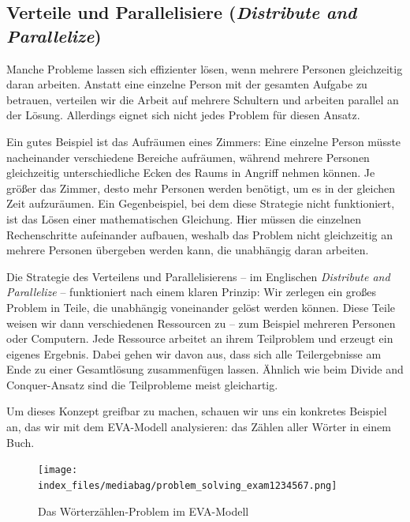 \documentclass[
  letterpaper,
  DIV=11]{scrreprt}
\begin{document}
\subsection{\texorpdfstring{Verteile und Parallelisiere
(\emph{Distribute and
Parallelize})}{Verteile und Parallelisiere (Distribute and Parallelize)}}\label{verteile-und-parallelisiere-distribute-and-parallelize}

Manche Probleme lassen sich effizienter lösen, wenn mehrere Personen
gleichzeitig daran arbeiten. Anstatt eine einzelne Person mit der
gesamten Aufgabe zu betrauen, verteilen wir die Arbeit auf mehrere
Schultern und arbeiten parallel an der Lösung. Allerdings eignet sich
nicht jedes Problem für diesen Ansatz.

Ein gutes Beispiel ist das Aufräumen eines Zimmers: Eine einzelne Person
müsste nacheinander verschiedene Bereiche aufräumen, während mehrere
Personen gleichzeitig unterschiedliche Ecken des Raums in Angriff nehmen
können. Je größer das Zimmer, desto mehr Personen werden benötigt, um es
in der gleichen Zeit aufzuräumen. Ein Gegenbeispiel, bei dem diese
Strategie nicht funktioniert, ist das Lösen einer mathematischen
Gleichung. Hier müssen die einzelnen Rechenschritte aufeinander
aufbauen, weshalb das Problem nicht gleichzeitig an mehrere Personen
übergeben werden kann, die unabhängig daran arbeiten.

Die Strategie des Verteilens und Parallelisierens -- im Englischen
\emph{Distribute and Parallelize} -- funktioniert nach einem klaren
Prinzip: Wir zerlegen ein großes Problem in Teile, die unabhängig
voneinander gelöst werden können. Diese Teile weisen wir dann
verschiedenen Ressourcen zu -- zum Beispiel mehreren Personen oder
Computern. Jede Ressource arbeitet an ihrem Teilproblem und erzeugt ein
eigenes Ergebnis. Dabei gehen wir davon aus, dass sich alle
Teilergebnisse am Ende zu einer Gesamtlösung zusammenfügen lassen.
Ähnlich wie beim Divide and Conquer-Ansatz sind die Teilprobleme meist
gleichartig.

Um dieses Konzept greifbar zu machen, schauen wir uns ein konkretes
Beispiel an, das wir mit dem EVA-Modell analysieren: das Zählen aller
Wörter in einem Buch.

\begin{figure}[H]

{\centering \texttt{[image: index\_files/mediabag/problem\_solving\_exam1234567.png]}

}

\caption{Das Wörterzählen-Problem im EVA-Modell}

\end{figure}%
\end{document}
